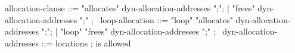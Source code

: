 \begin{syntax}
  allocation-clause ::= "allocates" dyn-allocation-addresses ";";
                      | "frees" dyn-allocation-addresses ";" ;
  \
  loop-allocation ::= "loop" "allocates"  dyn-allocation-addresses ";";
                    | "loop" "frees"  dyn-allocation-addresses ";" ;
  \
  dyn-allocation-addresses ::= locations ; \nothing is allowed
 \end{syntax}
